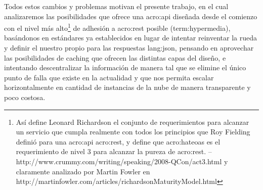 Todos estos cambios y problemas motivan el presente trabajo, en el cual analizaremos las posibilidades que ofrece una \gls{acro:api} diseñada desde el comienzo con el nivel más alto\footnote{Así define Leonard Richardson el conjunto de requerimientos para alcanzar un servicio que cumpla realmente con todos los principios que Roy Fielding definió para una \gls{acro:api} \gls{acro:rest}, y define que \gls{acro:hateoas} es el requerimiento de nivel 3 para alcanzar la pureza de \gls{acro:rest}. – http://www.crummy.com/writing/speaking/2008-QCon/act3.html y claramente analizado por Martin Fowler en http://martinfowler.com/articles/richardsonMaturityModel.html} de adhesión a \gls{acro:rest} posible (\gls{term:hypermedia}), basándonos en estándares ya establecidos en lugar de intentar reinventar la rueda y definir el nuestro propio para las respuestas \gls{lang:json}, pensando en aprovechar las posibilidades de caching que ofrecen las distintas capas del diseño, e intentando descentralizar la información de manera tal que se elimine el único punto de falla que existe en la actualidad y que nos permita escalar horizontalmente en cantidad de instancias de la nube de manera transparente y poco costosa.
